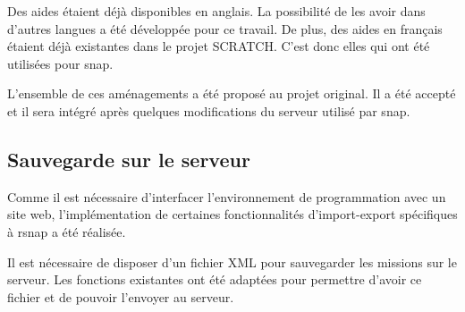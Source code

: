 Des aides étaient déjà disponibles en anglais. La possibilité de les avoir dans d'autres langues a été développée pour ce travail. De plus, des aides en français étaient déjà existantes dans le projet SCRATCH. C'est donc elles qui ont été utilisées pour \gls{snap}.

L'ensemble de ces aménagements a été proposé au projet original. Il a été accepté et il sera intégré après quelques modifications du serveur utilisé par \gls{snap}.

\subsection{Sauvegarde sur le serveur}
Comme il est nécessaire d'interfacer l'environnement de programmation avec un site web, l'implémentation de certaines fonctionnalités d'import-export spécifiques à \gls{rsnap} a été réalisée.

Il est nécessaire de disposer d'un fichier XML pour sauvegarder les \glspl{mission} sur le serveur. Les fonctions existantes ont été adaptées pour permettre d'avoir ce fichier et de pouvoir l'envoyer au serveur.
